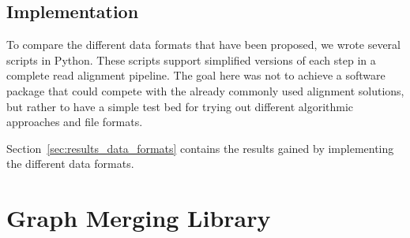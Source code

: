 \documentclass[a4paper,12pt,twoside,BCOR=10mm]{scrbook}
\begin{document}
\subsection{Implementation}
%

To compare the different data formats that have been proposed,
we wrote several scripts in Python.
These scripts support simplified versions of each step in a complete read alignment pipeline.
The goal here was not to achieve a software package that could compete with
the already commonly used alignment solutions, but rather to have a
simple test bed for trying out different algorithmic approaches and file formats.

Section~\ref{sec:results_data_formats} contains the results gained by
implementing the different data formats.

\section{Graph Merging Library}
%
\end{document}
